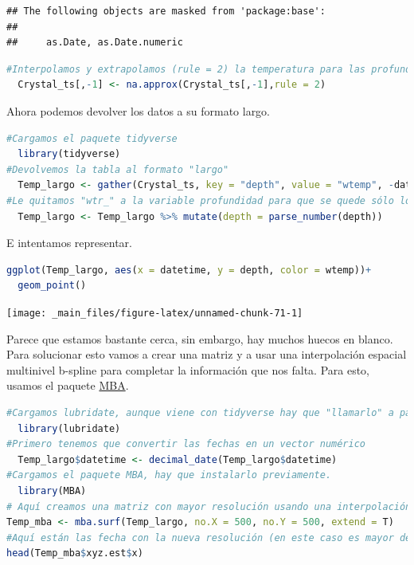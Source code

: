 \documentclass[
]{book}
\begin{document}
\begin{lstlisting}
## The following objects are masked from 'package:base':
## 
##     as.Date, as.Date.numeric
\end{lstlisting}

\begin{lstlisting}[language=R]
#Interpolamos y extrapolamos (rule = 2) la temperatura para las profundidades que nos faltan.
  Crystal_ts[,-1] <- na.approx(Crystal_ts[,-1],rule = 2)
\end{lstlisting}

Ahora podemos devolver los datos a su formato largo.

\begin{lstlisting}[language=R]
#Cargamos el paquete tidyverse
  library(tidyverse)
#Devolvemos la tabla al formato "largo"
  Temp_largo <- gather(Crystal_ts, key = "depth", value = "wtemp", -datetime)
#Le quitamos "wtr_" a la variable profundidad para que se quede sólo los números.
  Temp_largo <- Temp_largo %>% mutate(depth = parse_number(depth))
\end{lstlisting}

E intentamos representar.

\begin{lstlisting}[language=R]
ggplot(Temp_largo, aes(x = datetime, y = depth, color = wtemp))+
  geom_point()
\end{lstlisting}

\texttt{[image: \_main\_files/figure-latex/unnamed-chunk-71-1]}

Parece que estamos bastante cerca, sin embargo, hay muchos huecos en blanco. Para solucionar esto vamos a crear una matriz y a usar una interpolación espacial multinivel b-spline para completar la información que nos falta. Para esto, usamos el paquete \href{https://cran.r-project.org/web/packages/MBA/MBA.pdf}{MBA}.

\begin{lstlisting}[language=R]
#Cargamos lubridate, aunque viene con tidyverse hay que "llamarlo" a parte.
  library(lubridate)
#Primero tenemos que convertir las fechas en un vector numérico
  Temp_largo$datetime <- decimal_date(Temp_largo$datetime)
#Cargamos el paquete MBA, hay que instalarlo previamente.
  library(MBA)
# Aquí creamos una matriz con mayor resolución usando una interpolación espacial multinivel b-spline
Temp_mba <- mba.surf(Temp_largo, no.X = 500, no.Y = 500, extend = T)
#Aquí están las fecha con la nueva resolución (en este caso es mayor de la que teniamos, 500 "perfiles", frente a los 189 que teníamos)
head(Temp_mba$xyz.est$x)
\end{lstlisting}
\end{document}

